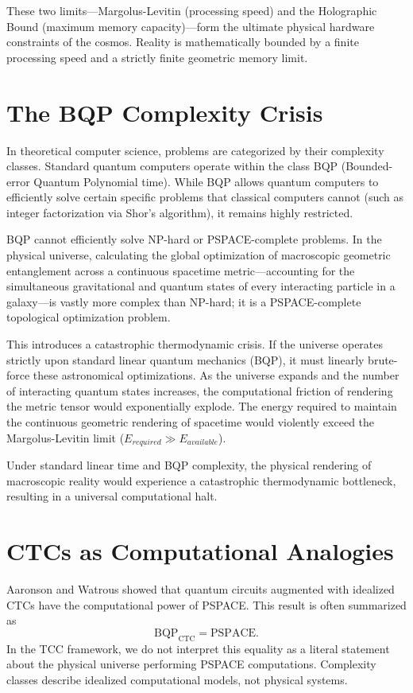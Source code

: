 \documentclass[12pt,openany]{book}
\theoremstyle{plain}
\theoremstyle{definition}
\theoremstyle{remark}
\begin{document}
These two limits---Margolus-Levitin (processing speed) and the Holographic Bound (maximum memory capacity)---form the ultimate physical hardware constraints of the cosmos. Reality is mathematically bounded by a finite processing speed and a strictly finite geometric memory limit. 

\section{The BQP Complexity Crisis}

In theoretical computer science, problems are categorized by their complexity classes. Standard quantum computers operate within the class BQP (Bounded-error Quantum Polynomial time). While BQP allows quantum computers to efficiently solve certain specific problems that classical computers cannot (such as integer factorization via Shor's algorithm), it remains highly restricted. 

BQP cannot efficiently solve NP-hard or PSPACE-complete problems. In the physical universe, calculating the global optimization of macroscopic geometric entanglement across a continuous spacetime metric—accounting for the simultaneous gravitational and quantum states of every interacting particle in a galaxy—is vastly more complex than NP-hard; it is a PSPACE-complete topological optimization problem.

This introduces a catastrophic thermodynamic crisis. If the universe operates strictly upon standard linear quantum mechanics (BQP), it must linearly brute-force these astronomical optimizations. As the universe expands and the number of interacting quantum states increases, the computational friction of rendering the metric tensor would exponentially explode. The energy required to maintain the continuous geometric rendering of spacetime would violently exceed the Margolus-Levitin limit ($E_{required} \gg E_{available}$).

Under standard linear time and BQP complexity, the physical rendering of macroscopic reality would experience a catastrophic thermodynamic bottleneck, resulting in a universal computational halt.

\section{CTCs as Computational Analogies}

Aaronson and Watrous \cite{aaronson2009} showed that quantum circuits augmented with idealized 
CTCs have the computational power of PSPACE. 
This result is often summarized as
\[
\text{BQP}_{\text{CTC}} = \text{PSPACE}.
\]
In the TCC framework, we do not interpret this equality as a literal 
statement about the physical universe performing PSPACE computations. 
Complexity classes describe idealized computational models, not physical 
systems.
\end{document}
